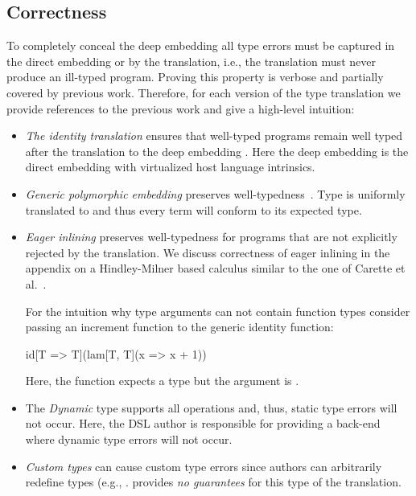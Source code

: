 \subsection{Correctness}
\label{sec:correctness}
To completely conceal the deep embedding all type errors must be captured in the direct embedding or by the translation, i.e., the translation must never produce an ill-typed program. Proving this property is verbose and partially covered by previous work. Therefore, for each version of the type translation we provide references to the previous work and give a high-level intuition:
\begin{itemize}

\item \emph{The identity translation} ensures that well-typed programs remain
well typed after the translation to the deep embedding
\cite{carette_finally_2009}. Here the deep embedding is the direct embedding
with virtualized host language intrinsics.

\item \emph{Generic polymorphic embedding} preserves well-typedness~\cite{carette_finally_2009}.
 Type  is uniformly translated to  and thus every term will conform to its expected type.

\item \emph{Eager inlining} preserves well-typedness for programs that are
not explicitly rejected by the translation. We discuss correctness of eager inlining
in the appendix on a Hindley-Milner based calculus similar to the one of Carette et al.~\cite{carette_finally_2009}.

For the intuition why type arguments can not contain function types consider passing an increment function to the generic identity function:\begin{lstparagraph}
  id[T => T](lam[T, T](x => x + 1))
\end{lstparagraph}
Here, the  function expects a  type but the argument is .

\item The \emph{Dynamic} type supports all operations and, thus, static type errors will not occur. Here, the DSL author is responsible for providing a back-end where dynamic type errors will not occur.

\item \emph{Custom types} can cause custom type errors since \edsl authors can
arbitrarily redefine types (e.g., . \yy provides
\emph{no guarantees} for this type of the translation.


\end{itemize}


